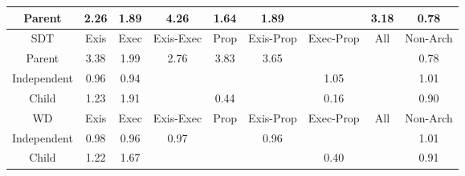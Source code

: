 \begin{tabular}{|c||c|c|c|c|c|c|c|c|}
\hline
Parent & \cellcolor[rgb]{0.8785928217732052,0.8251229155767814,0.42} 2.26 & \cellcolor[rgb]{0.8878091633966426,0.8294885510826202,0.42} 1.89 & \cellcolor[rgb]{0.8287300091437947,0.8015036885417975,0.42} 4.26 & \cellcolor[rgb]{0.893991880077487,0.8324172063524937,0.42} 1.64 & \cellcolor[rgb]{0.8878797366588101,0.8295219805225942,0.42} 1.89 &  & \cellcolor[rgb]{0.8554733889882805,0.8141716053102381,0.42} 3.18 & \cellcolor[rgb]{0.8733587294317562,0.666564652643646,0.38580148080297244} 0.78 \\ 
\hline
\hline
SDT & Exis & Exec & Exis-Exec & Prop & Exis-Prop & Exec-Prop & All & Non-Arch \\ 
\hline
Parent & \cellcolor[rgb]{0.8505763874944219,0.8118519730236734,0.42} 3.38 & \cellcolor[rgb]{0.8853965190034042,0.8283457195279282,0.41999999999999993} 1.99 & \cellcolor[rgb]{0.8660886749978219,0.8191998986831788,0.42} 2.76 & \cellcolor[rgb]{0.8393916925869271,0.8065539596464392,0.42} 3.83 & \cellcolor[rgb]{0.8439229796860527,0.8087003587986565,0.42} 3.65 &  &  & \cellcolor[rgb]{0.8743670364113236,0.6713373056802652,0.38674256731723533} 0.78 \\ 
\hline
Independent & \cellcolor[rgb]{0.9042000628207915,0.8125469640184123,0.4145867252994052} 0.96 & \cellcolor[rgb]{0.9007801375694326,0.796359317828648,0.4113947950648038} 0.94 &  &  &  & \cellcolor[rgb]{0.9087624924345223,0.8394138122058262,0.42} 1.05 &  & \cellcolor[rgb]{0.9098250906191429,0.839917148188015,0.42} 1.01 \\ 
\hline
Child & \cellcolor[rgb]{0.904383612361586,0.8373396058554881,0.42} 1.23 & \cellcolor[rgb]{0.8872423269303304,0.8292200495985775,0.42} 1.91 &  & \cellcolor[rgb]{0.8182699577540217,0.4058111333690357,0.3343852939037535} 0.44 &  & \cellcolor[rgb]{0.772606235655789,0.18966951543740113,0.29176581994540307} 0.16 &  & \cellcolor[rgb]{0.8943078359507088,0.7657237568333548,0.4053539802206615} 0.90 \\ 
\hline
\hline
WD & Exis & Exec & Exis-Exec & Prop & Exis-Prop & Exec-Prop & All & Non-Arch \\ 
\hline
Independent & \cellcolor[rgb]{0.9059900502935497,0.8210195713894685,0.4162573802739797} 0.98 & \cellcolor[rgb]{0.9030617627178107,0.8071590101976368,0.4135243118699566} 0.96 & \cellcolor[rgb]{0.9044480110895404,0.8137205858238244,0.414818143683571} 0.97 &  & \cellcolor[rgb]{0.9037662555132394,0.8104936094293334,0.41418183847902346} 0.96 &  &  & \cellcolor[rgb]{0.9098319387400307,0.8399203920347513,0.42} 1.01 \\ 
\hline
Child & \cellcolor[rgb]{0.904512357952937,0.837400590609286,0.42} 1.22 & \cellcolor[rgb]{0.8932602516416165,0.8320706455144499,0.42} 1.67 &  &  &  & \cellcolor[rgb]{0.8105872128504229,0.36944614082533517,0.3272147319937281} 0.40 &  & \cellcolor[rgb]{0.8952294360893741,0.7700859974897036,0.4062141403500824} 0.91 \\ 

\end{tabular}
